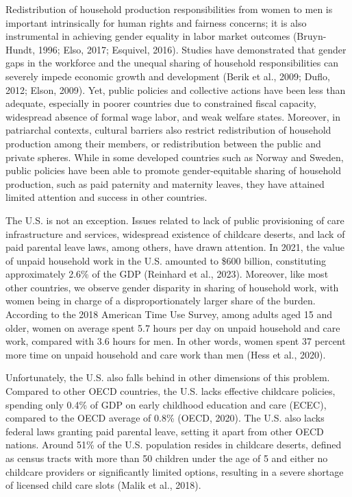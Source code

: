 \documentclass[
  11pt,
]{article}
\begin{document}
Redistribution of household production responsibilities from women to
men is important intrinsically for human rights and fairness concerns;
it is also instrumental in achieving gender equality in labor market
outcomes (Bruyn-Hundt, 1996; Elso, 2017; Esquivel, 2016). Studies have
demonstrated that gender gaps in the workforce and the unequal sharing
of household responsibilities can severely impede economic growth and
development (Berik et al., 2009; Duflo, 2012; Elson, 2009). Yet, public
policies and collective actions have been less than adequate, especially
in poorer countries due to constrained fiscal capacity, widespread
absence of formal wage labor, and weak welfare states. Moreover, in
patriarchal contexts, cultural barriers also restrict redistribution of
household production among their members, or redistribution between the
public and private spheres. While in some developed countries such as
Norway and Sweden, public policies have been able to promote
gender-equitable sharing of household production, such as paid paternity
and maternity leaves, they have attained limited attention and success
in other countries.

The U.S. is not an exception. Issues related to lack of public
provisioning of care infrastructure and services, widespread existence
of childcare deserts, and lack of paid parental leave laws, among
others, have drawn attention. In 2021, the value of unpaid household
work in the U.S. amounted to \$600 billion, constituting approximately
2.6\% of the GDP (Reinhard et al., 2023). Moreover, like most other
countries, we observe gender disparity in sharing of household work,
with women being in charge of a disproportionately larger share of the
burden. According to the 2018 American Time Use Survey, among adults
aged 15 and older, women on average spent 5.7 hours per day on unpaid
household and care work, compared with 3.6 hours for men. In other
words, women spent 37 percent more time on unpaid household and care
work than men (Hess et al., 2020).

Unfortunately, the U.S. also falls behind in other dimensions of this
problem. Compared to other OECD countries, the U.S. lacks effective
childcare policies, spending only 0.4\% of GDP on early childhood
education and care (ECEC), compared to the OECD average of 0.8\% (OECD,
2020). The U.S. also lacks federal laws granting paid parental leave,
setting it apart from other OECD nations. Around 51\% of the U.S.
population resides in childcare deserts, defined as census tracts with
more than 50 children under the age of 5 and either no childcare
providers or significantly limited options, resulting in a severe
shortage of licensed child care slots (Malik et al., 2018).
\end{document}
